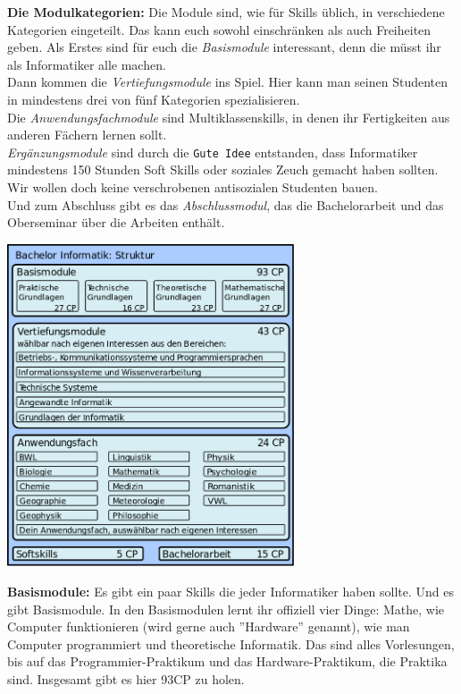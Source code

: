 \textbf{Die Modulkategorien:}
Die Module sind, wie f\"ur Skills \"ublich, in verschiedene Kategorien
eingeteilt. Das kann euch sowohl einschr\"anken als auch Freiheiten geben.
Als Erstes sind f\"ur euch die \emph{Basismodule} interessant, denn die m\"usst ihr als Informatiker alle machen.\\
Dann kommen die \emph{Vertiefungsmodule} ins Spiel. Hier kann man seinen Studenten in mindestens drei von f\"unf Kategorien spezialisieren.\\
Die \emph{Anwendungsfachmodule} sind Multiklassenskills, in denen ihr Fertigkeiten aus anderen F\"achern lernen sollt.\\
\emph{Erg\"anzungsmodule} sind durch die \texttt{Gute Idee\texttrademark} entstanden, dass Informatiker mindestens 150 Stunden Soft Skills oder soziales Zeuch gemacht haben sollten. Wir wollen doch keine verschrobenen antisozialen Studenten bauen.\\
Und zum Abschluss gibt es das \emph{Abschlussmodul}, das die Bachelorarbeit und das Oberseminar \"uber die Arbeiten enth\"alt.\\

\begin{center}
\includegraphics[width=85mm]{bilder/BacInfStruktur}
\end{center}


\textbf{Basismodule:}
Es gibt ein paar Skills die jeder Informatiker haben sollte. Und es gibt
Basismodule. In den Basismodulen lernt ihr offiziell vier Dinge: Mathe, wie
Computer funktionieren (wird gerne auch ''Hardware'' genannt), wie man Computer
programmiert und theoretische Informatik. Das sind alles Vorlesungen, bis auf
das Programmier-Praktikum und das Hardware-Praktikum, die Praktika sind.
Insgesamt gibt es hier 93CP zu holen.

